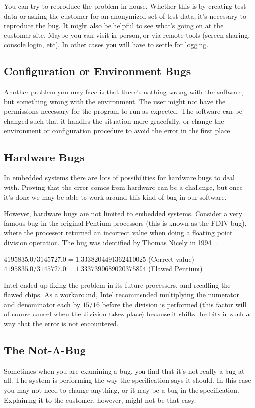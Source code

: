 You can try to reproduce the problem in house. Whether this is by creating test data or asking the customer for an anonymized set of test data, it's necessary to reproduce the bug. It might also be helpful to see what's going on at the customer site. Maybe you can visit in person, or via remote tools (screen sharing, console login, etc). In other cases you will have to settle for logging.

\subsection*{Configuration or Environment Bugs}
Another problem you may face is that there's nothing wrong with the software, but something wrong with the environment. The user might not have the permissions necessary for the program to run as expected. The software can be changed such that it handles the situation more gracefully, or change the environment or configuration procedure to avoid the error in the first place.

\subsection*{Hardware Bugs}
In embedded systems there are lots of possibilities for hardware bugs to deal with. Proving that the error comes from hardware can be a challenge, but once it's done we may be able to work around this kind of bug in our software.  

However, hardware bugs are not limited to embedded systems. Consider a very famous bug in the original Pentium processors (this is known as the FDIV bug), where the processor returned an incorrect value when doing a floating point division operation. The bug was identified by Thomas Nicely in 1994~\cite{fdiv}.

$4195835.0/3145727.0 = 1.333 820 449 136 241 002 5$  (Correct value)\\
$4195835.0/3145727.0 = 1.333 739 068 902 037 589 4$  (Flawed Pentium)

Intel ended up fixing the problem in its future processors, and recalling the flawed chips. As a workaround, Intel recommended multiplying the numerator and denominator each by $15/16$ before the division is performed (this factor will of course cancel when the division takes place) because it shifts the bits in such a way that the error is not encountered. 


\subsection*{The Not-A-Bug}
Sometimes when you are examining a bug, you find that it's not really a bug at all. The system is performing the way the specification says it should. In this case you may not need to change anything, or it may be a bug in the specification. Explaining it to the customer, however, might not be that easy.




